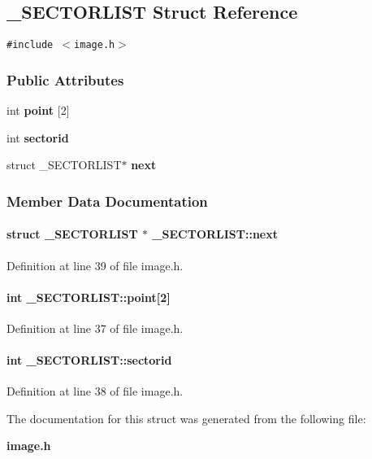 \subsection{\_\-SECTORLIST  Struct Reference}
\label{_SECTORLIST}
{\tt \#include $<$image.h$>$}

\subsubsection*{Public Attributes}
\begin{CompactItemize}
\item 
int {\bf point} [2]
\item 
int {\bf sectorid}
\item 
struct \_\-SECTORLIST$\ast$ {\bf next}
\end{CompactItemize}


\subsubsection{Member Data Documentation}
\label{_SECTORLIST_m2}
\paragraph{\setlength{\rightskip}{0pt plus 5cm}struct \_\-SECTORLIST $\ast$ \_\-SECTORLIST::next}\hfill



Definition at line 39 of file image.h.\label{_SECTORLIST_m0}
\paragraph{\setlength{\rightskip}{0pt plus 5cm}int \_\-SECTORLIST::point[2]}\hfill



Definition at line 37 of file image.h.\label{_SECTORLIST_m1}
\paragraph{\setlength{\rightskip}{0pt plus 5cm}int \_\-SECTORLIST::sectorid}\hfill



Definition at line 38 of file image.h.

The documentation for this struct was generated from the following file:\begin{CompactItemize}
\item 
{\bf image.h}\end{CompactItemize}
